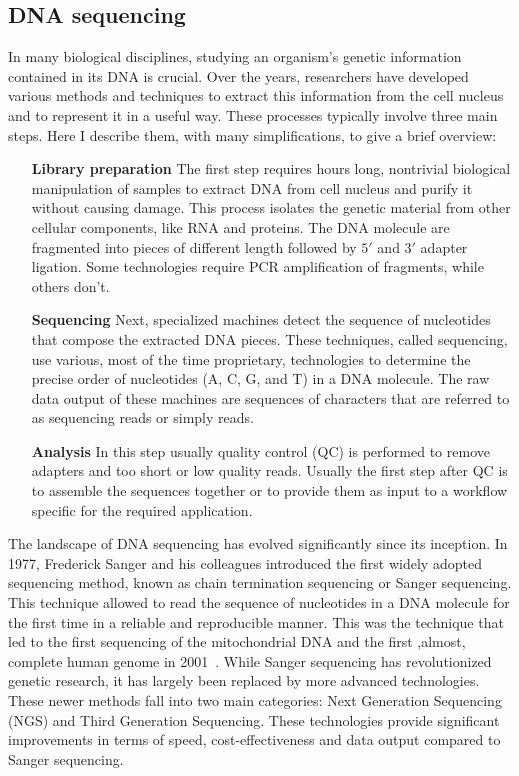 \subsection*{DNA sequencing}
In many biological disciplines, studying an organism's genetic information contained in its DNA is crucial. Over the years, researchers have developed various methods and techniques to extract this information from the cell nucleus and to represent it in a useful way. These processes typically involve three main steps. Here I describe them, with many simplifications, to give a brief overview:
\begin{itemize}[leftmargin=1.8cm]
	\item[\textbf{Library preparation}] The first step requires hours long, nontrivial biological manipulation of samples to extract DNA from cell nucleus and purify it without causing damage. This process isolates the genetic material from other cellular components, like RNA and proteins. The DNA molecule are fragmented into pieces of different length followed by $5\prime$ and $3\prime$ adapter ligation. Some technologies require PCR amplification of fragments, while others don't.
	\item[\textbf{Sequencing}] Next, specialized machines detect the sequence of nucleotides that compose the extracted DNA pieces. These techniques, called sequencing, use various, most of the time proprietary, technologies to determine the precise order of nucleotides (A, C, G, and T) in a DNA molecule. The raw data output of these machines are sequences of characters that are referred to as sequencing reads or simply reads.
	\item[\textbf{Analysis}] In this step usually quality control (QC) is performed to remove adapters and too short or low quality reads. Usually the first step after QC is to assemble the sequences together or to provide them as input to a workflow specific for the required application.
\end{itemize}
The landscape of DNA sequencing has evolved significantly since its inception. In 1977, Frederick Sanger and his colleagues introduced the first widely adopted sequencing method, known as chain termination sequencing or Sanger sequencing\cite{sanger_sequencing}. This technique allowed to read the sequence of nucleotides in a DNA molecule for the first time in a reliable and reproducible manner. This was the technique that led to the first sequencing of the mitochondrial DNA and the first ,almost, complete human genome in 2001~\cite{mitochondrialDNA,first_human_genome}.
While Sanger sequencing has revolutionized genetic research, it has largely been replaced by more advanced technologies. These newer methods fall into two main categories: Next Generation Sequencing (NGS) and Third Generation Sequencing. These technologies provide significant improvements in terms of speed, cost-effectiveness and data output compared to Sanger sequencing. \\
